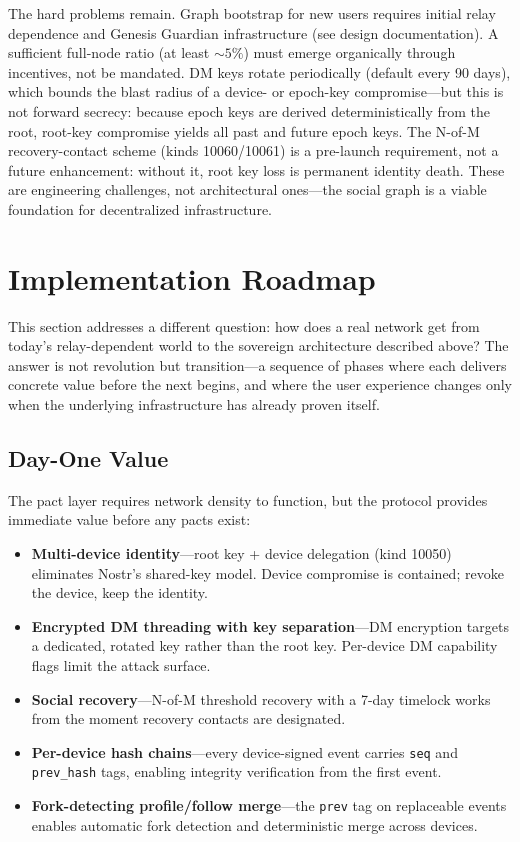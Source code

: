\documentclass[11pt,a4paper]{article}
\begin{document}
The hard problems remain. Graph bootstrap for new users requires initial relay dependence and Genesis Guardian infrastructure (see design documentation). A sufficient full-node ratio (at least ${\sim}5\%$) must emerge organically through incentives, not be mandated. DM keys rotate periodically (default every 90 days), which bounds the blast radius of a device- or epoch-key compromise---but this is not forward secrecy: because epoch keys are derived deterministically from the root, root-key compromise yields all past and future epoch keys. The N-of-M recovery-contact scheme (kinds 10060/10061) is a pre-launch requirement, not a future enhancement: without it, root key loss is permanent identity death. These are engineering challenges, not architectural ones---the social graph is a viable foundation for decentralized infrastructure.

\section{Implementation Roadmap}
\label{sec:roadmap}

This section addresses a different question: how does a real network get from today's relay-dependent world to the sovereign architecture described above? The answer is not revolution but transition---a sequence of phases where each delivers concrete value before the next begins, and where the user experience changes only when the underlying infrastructure has already proven itself.

\subsection{Day-One Value}

The pact layer requires network density to function, but the protocol provides immediate value before any pacts exist:

\begin{itemize}
  \item \textbf{Multi-device identity}---root key + device delegation (kind 10050) eliminates Nostr's shared-key model. Device compromise is contained; revoke the device, keep the identity.
  \item \textbf{Encrypted DM threading with key separation}---DM encryption targets a dedicated, rotated key rather than the root key. Per-device DM capability flags limit the attack surface.
  \item \textbf{Social recovery}---N-of-M threshold recovery with a 7-day timelock works from the moment recovery contacts are designated.
  \item \textbf{Per-device hash chains}---every device-signed event carries \texttt{seq} and \texttt{prev\_hash} tags, enabling integrity verification from the first event.
  \item \textbf{Fork-detecting profile/follow merge}---the \texttt{prev} tag on replaceable events enables automatic fork detection and deterministic merge across devices.
\end{itemize}
\end{document}
